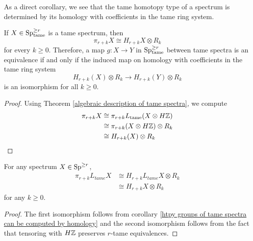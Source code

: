 As a direct corollary, we see that the tame homotopy type of a spectrum is determined by its homology with coefficients in the tame ring system.
\begin{corollary}
\label{htpy groups of tame spectra can be computed by homology}
	If $X\in \operatorname{Sp}^{\geq r}_{\operatorname{\operatorname{tame}}}$ is a tame spectrum, then 
	\[
	\pi_{r+k}X \cong H_{r+k}X \otimes R_k
	\]
	for every $k\geq 0$. Therefore, a map $g:X\to Y$ in $\operatorname{Sp}^{\geq r}_{\operatorname{\operatorname{tame}}}$ between tame spectra is an equivalence if and only if the induced map on homology with coefficients in the tame ring system
	$$
	H_{r+k}(X)\otimes R_k \to H_{r+k}(Y)\otimes R_k
	$$ 
	is an isomorphism for all $k\geq 0$.    
\end{corollary}
	
\begin{proof}
	Using Theorem \ref{algebraic description of tame spectra}, we compute
	\begin{align*}
		\pi_{r+k}X  &\cong \pi_{r+k}L_{\operatorname{\operatorname{tame}}}(X\otimes H{\mathbb{Z}})\\
		& \cong \pi_{r+k}(X\otimes H{\mathbb{Z}})\otimes R_k\\
		& \cong H_{r+k}(X)\otimes R_k
	\end{align*}
\end{proof}

\begin{corollary}
\label{homotopy groups of tame spectra are hmlg with coeff in tame ring system}
		For any spectrum $X\in \operatorname{Sp}^{\geq r}$, 
\begin{align*}
	\pi_{r+k} L_{tame}X & \cong H_{r+k} L_{tame}X \otimes R_{k}\\
		& \cong H_{r+k} X \otimes R_{k}
\end{align*}
for any $k\geq 0$.

\end{corollary}
\begin{proof}
	The first isomorphism follows from corollary \ref{htpy groups of tame spectra can be computed by homology} and the second isomorphism follows from the fact that tensoring with $H{\mathbb{Z}}$ preserves $r$-tame equivalences.
	
\end{proof}

